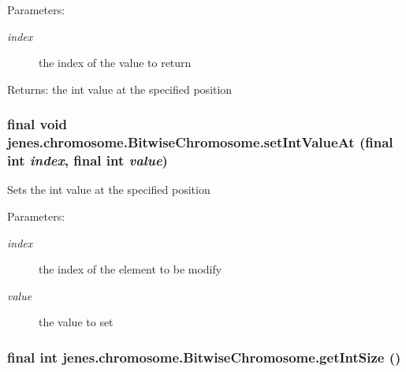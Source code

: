 \begin{Desc}
\item[Parameters:]
\begin{description}
\item[{\em index}]the index of the value to return \end{description}
\end{Desc}
\begin{Desc}
\item[Returns:]the int value at the specified position \end{Desc}
\hypertarget{classjenes_1_1chromosome_1_1_bitwise_chromosome_3cbcf428333a0dc4209ce2c820054542}{
\subsubsection[setIntValueAt]{\setlength{\rightskip}{0pt plus 5cm}final void jenes.chromosome.BitwiseChromosome.setIntValueAt (final int {\em index}, \/  final int {\em value})}}
\label{classjenes_1_1chromosome_1_1_bitwise_chromosome_3cbcf428333a0dc4209ce2c820054542}


Sets the int value at the specified position

\begin{Desc}
\item[Parameters:]
\begin{description}
\item[{\em index}]the index of the element to be modify \item[{\em value}]the value to set \end{description}
\end{Desc}
\hypertarget{classjenes_1_1chromosome_1_1_bitwise_chromosome_36e6b8c849d563a359245763116667d5}{
\subsubsection[getIntSize]{\setlength{\rightskip}{0pt plus 5cm}final int jenes.chromosome.BitwiseChromosome.getIntSize ()}}
\label{classjenes_1_1chromosome_1_1_bitwise_chromosome_36e6b8c849d563a359245763116667d5}


